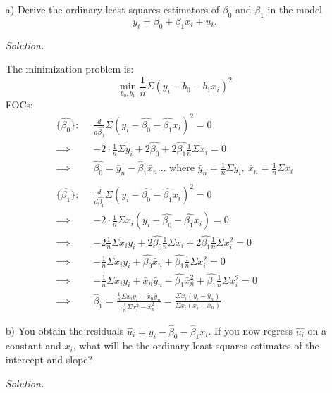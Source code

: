 \documentclass[
]{article}
\begin{document}
\begin{enumerate} 
\item[a)] Derive the ordinary least squares estimators of $\beta_0$ and $\beta_1$ in the model
\[y_i = \beta_0 + \beta_1 x_i + u_i.\]
  
\textit{Solution.}  

The minimization problem is:
\[\min _ {b_0, b_1} \frac{1}{n}\Sigma(y_i-b_0-b_1 x_i)^2\]
FOCs: 
\[\begin{aligned}
\{\hat{\beta_0}\}: \; \; &\frac{d}{d\hat{\beta_0}} \Sigma(y_i-\hat{\beta_0}-\hat{\beta_1} x_i)^2 = 0\\
\implies& -2\cdot \frac{1}{n}\Sigma y_i +2\hat{\beta_0} + 2 \hat{\beta_1} \frac{1}{n}\Sigma x_i = 0  \\
\implies& \hat{\beta_0} = \bar{y}_n - \hat{\beta}_1 \bar{x}_n \dots \text{ where } \bar{y}_n = \frac{1}{n}\Sigma y_i,\: \bar{x}_n=\frac{1}{n}\Sigma x_i \\
\\
\{\hat{\beta_1}\}: \; \; &\frac{d}{d\hat{\beta_1}} \Sigma(y_i-\hat{\beta_0}-\hat{\beta_1} x_i)^2 = 0\\
\implies& -2\cdot\frac{1}{n}\Sigma x_i(y_i-\hat{\beta_0}-\hat{\beta_1} x_i) = 0  \\
\implies& -2 \frac{1}{n}\Sigma x_iy_i + 2 \hat{\beta_0}\frac{1}{n} \Sigma x_i+ 2 \hat{\beta_1} \frac{1}{n}\Sigma x_i^2 = 0 \\
\implies& -\frac{1}{n}\Sigma x_iy_i +  \hat{\beta_0}\bar{x}_n+  \hat{\beta_1} \frac{1}{n}\Sigma x_i^2 = 0 \\
\implies& -\frac{1}{n}\Sigma x_iy_i +  \bar{x}_n\bar{y}_n - \hat{\beta_1} \bar{x}_n ^2+  \hat{\beta_1} \frac{1}{n}\Sigma x_i^2 = 0 \\
\implies& \hat{\beta}_1 = \frac{\frac{1}{n}\Sigma x_iy_i - \bar{x}_n\bar{y}_n}{\frac{1}{n}\Sigma x_i^2 - \bar{x}_n ^2}  = \frac{\Sigma x_i(y_i-\bar{y}_n)}{\Sigma x_i(x_i-\bar{x}_n)} 
\end{aligned}\]


\item[b)] You obtain the residuals $\hat{u}_i = y_i - \hat{\beta}_0 - \hat{\beta}_1 x_i$. If you now regress $\hat{u_i}$ on a constant and $x_i$, what will be the ordinary least squares estimates of the intercept and slope?  
  
\textit{Solution. }  


\end{enumerate}
\end{document}
